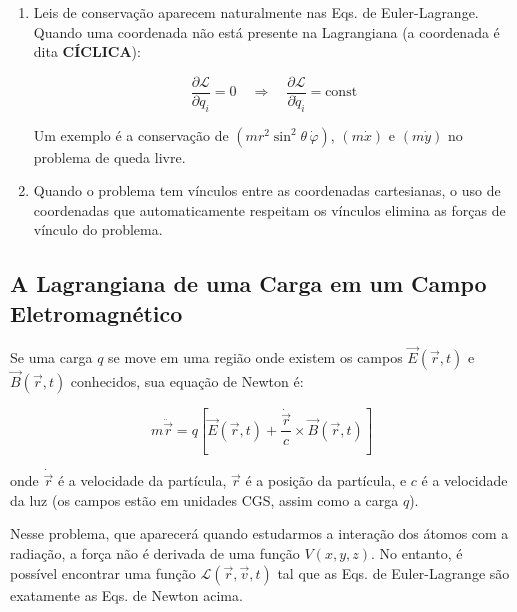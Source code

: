 \begin{enumerate}

\item[(iv)] Leis de conservação aparecem naturalmente nas Eqs. de Euler-Lagrange. Quando uma coordenada não está presente na Lagrangiana (a coordenada é dita \textbf{CÍCLICA}):

\begin{equation}
\frac{\partial \mathcal{L}}{\partial q_i} = 0 \quad \Longrightarrow \quad \boxed{\frac{\partial \mathcal{L}}{\partial \dot{q}_i} = \text{const}}
\label{eq:aula8_coordenada_ciclica}
\end{equation}

Um exemplo é a conservação de $\left(mr^2\sin^2\theta\,\dot{\varphi}\right)$, $(m\dot{x})$ e $(m\dot{y})$ no problema de queda livre.

\item[(v)] Quando o problema tem vínculos entre as coordenadas cartesianas, o uso de coordenadas que automaticamente respeitam os vínculos elimina as forças de vínculo do problema.
\end{enumerate}

\subsection*{A Lagrangiana de uma Carga em um Campo Eletromagnético}

Se uma carga $q$ se move em uma região onde existem os campos $\vec{E}(\vec{r}, t)$ e $\vec{B}(\vec{r}, t)$ conhecidos, sua equação de Newton é:

\begin{equation}
m\ddot{\vec{r}} = q\left[\vec{E}(\vec{r}, t) + \frac{\dot{\vec{r}}}{c} \times \vec{B}(\vec{r}, t)\right]
\label{eq:aula8_forca_lorentz}
\end{equation}

onde $\dot{\vec{r}}$ é a velocidade da partícula, $\vec{r}$ é a posição da partícula, e $c$ é a velocidade da luz (os campos estão em unidades CGS, assim como a carga $q$).

Nesse problema, que aparecerá quando estudarmos a interação dos átomos com a radiação, a força não é derivada de uma função $V(x,y,z)$. No entanto, é possível encontrar uma função $\mathcal{L}(\vec{r}, \vec{v}, t)$ tal que as Eqs. de Euler-Lagrange são exatamente as Eqs. de Newton acima.


